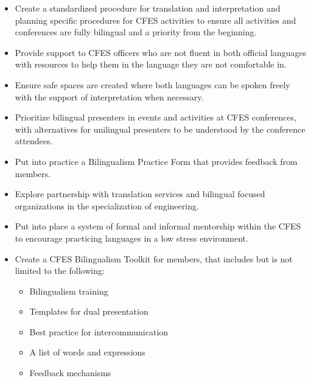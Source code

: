\begin{itemize}
 \item Create a standardized procedure for translation and interpretation and planning specific procedures for CFES activities to ensure all activities and conferences are fully bilingual and a priority from the beginning.
 \item Provide support to CFES officers who are not fluent in both official languages with resources to help them in the language they are not comfortable in.
 \item Ensure safe spaces are created where both languages can be spoken freely with the support of interpretation when necessary.
 \item Prioritize bilingual presenters in events and activities at CFES conferences, with alternatives for unilingual presenters to be understood by the conference attendees.
 \item Put into practice a Bilingualism Practice Form that provides feedback from members.
 \item Explore partnership with translation services and bilingual focused organizations in the specialization of engineering.
 \item Put into place a system of formal and informal mentorship within the CFES to encourage practicing languages in a low stress environment.
 \item Create a CFES Bilingualism Toolkit for members, that includes but is not limited to the following:
 \begin{itemize}
  \item Bilingualism training
  \item Templates for dual presentation
  \item Best practice for intercommunication
  \item A list of words and expressions
  \item Feedback mechanisms
 \end{itemize}
\end{itemize}

\newpage
